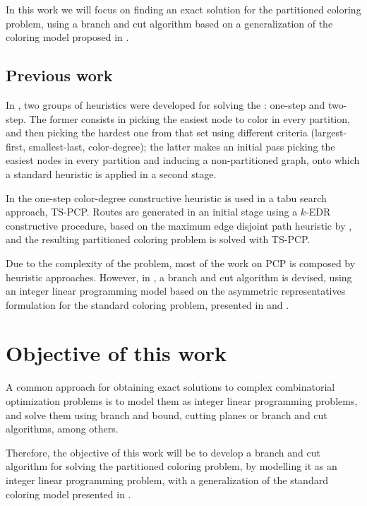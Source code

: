 In this work we will focus on finding an exact solution for the partitioned coloring problem, using a branch and cut algorithm based on a generalization of the coloring model proposed in \cite{mendez2006branch,mendez2008cutting}.

\subsection*{Previous work}

In \cite{Li00thepartition}, two groups of heuristics were developed for solving the \PCP{}: one-step and two-step. The former consists in picking the easiest node to color in every partition, and then picking the hardest one from that set using different criteria (largest-first, smallest-last, color-degree); the latter makes an initial pass picking the easiest nodes in every partition and inducing a non-partitioned graph, onto which a standard heuristic is applied in a second stage.

In \cite{noronha2006routing} the one-step color-degree constructive heuristic is used in a tabu search approach, TS-PCP. Routes are generated in an initial stage using a $k$-EDR constructive procedure, based on the maximum edge disjoint path heuristic by \cite{kleinberg1996approximation}, and the resulting partitioned coloring problem is solved with TS-PCP.

Due to the complexity of the problem, most of the work on PCP is composed by heuristic approaches. However, in \cite{frota2010branch}, a branch and cut algorithm is devised, using an integer linear programming model based on the asymmetric representatives formulation for the standard coloring problem, presented in \cite{campelo2004cliques} and \cite{campelo2008asymmetric}.

\section{Objective of this work}

A common approach for obtaining exact solutions to complex combinatorial optimization problems is to model them as integer linear programming problems, and solve them using branch and bound, cutting planes or branch and cut algorithms, among others. 

Therefore, the objective of this work will be to develop a branch and cut algorithm for solving the partitioned coloring problem, by modelling it as an integer linear programming problem, with a generalization of the standard coloring model presented in \cite{mendez2006branch,mendez2008cutting}. 

